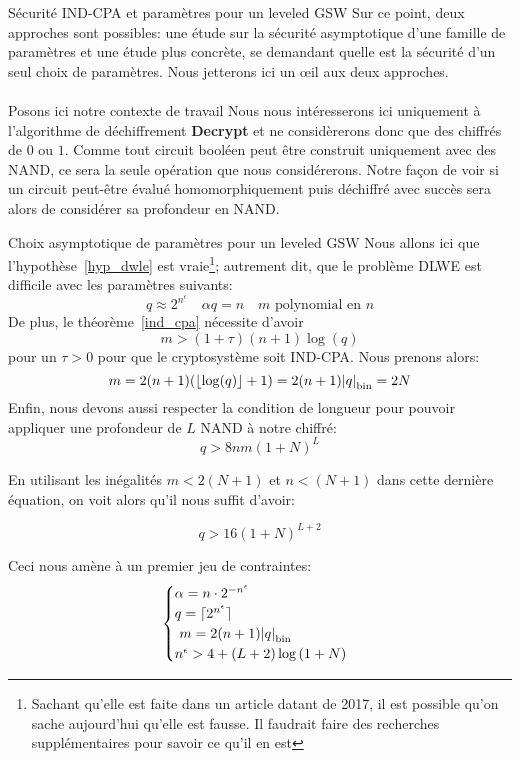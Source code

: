 \begin{section}{Sécurité IND-CPA et paramètres pour un leveled GSW}
Sur ce point, deux approches sont possibles: une étude sur la sécurité asymptotique d'une famille 
de paramètres et une étude plus concrète, se demandant quelle est la sécurité d'un seul choix de paramètres. 
Nous jetterons ici un \oe{}il aux deux approches.

\paragraph{}
Posons ici notre contexte de travail
Nous nous intéresserons ici uniquement à l'algorithme de déchiffrement
\textbf{Decrypt} et ne considèrerons donc que des chiffrés de $0$ ou
$1$. Comme tout circuit booléen peut être construit uniquement avec des NAND, ce sera la seule opération
que nous considérerons. Notre façon de voir si un circuit peut-être évalué homomorphiquement puis déchiffré
avec succès sera alors de considérer sa profondeur en NAND.

\begin{subsection}{Choix asymptotique de paramètres pour un leveled GSW}
\label{sec:leveled}
\label{param_leveled}
	Nous allons ici que l'hypothèse~\ref{hyp_dwle} est vraie\footnote{Sachant qu'elle est faite dans un 
	article datant de 2017, il est possible qu'on sache aujourd'hui qu'elle est fausse. Il faudrait faire des
	recherches supplémentaires
	pour savoir ce qu'il en est}; autrement dit, que le problème DLWE est difficile avec les paramètres suivants:
\[ q \approx 2^{n^\epsilon}\quad \alpha q = n\quad \text{$m$ polynomial en $n$}\]
De plus, le théorème~\ref{ind_cpa} nécessite d'avoir 
\[m > (1+\tau)(n+1)\log(q) \]
pour un $\tau > 0$ pour que le cryptosystème soit IND-CPA.  Nous prenons alors: 
\[ m = 2(n+1)(\lfloor \log(q) \rfloor + 1) = 2(n+1) {|q|}_{\text{bin}} = 2N\]
Enfin, nous devons aussi respecter la condition de longueur pour pouvoir appliquer une profondeur de $L$ NAND à notre chiffré:
\[q > 8nm (1 + N)^L \]

En utilisant les inégalités $m < 2 (N+1)$ et $n < (N+1)$ dans cette dernière équation, on voit alors qu'il nous suffit d'avoir:

\begin{equation*}
q > 16 {(1+N)}^{L+2}
\end{equation*}

Ceci nous amène à un premier jeu de contraintes: 
\[ \begin{cases}\alpha  = n \cdot 2^{-n^\epsilon}  \\
	q = \lceil 2^{n^\epsilon}\rceil\\ 
	m = 2(n+1)\bnorm{q} \\  
	n^\epsilon > 4 + (L+2) \log\left( 1 + N\right)
	\end{cases} \]


\end{subsection}
\end{section}
